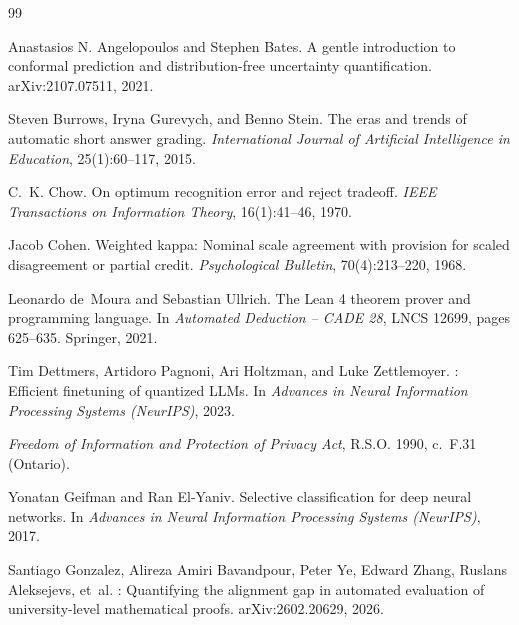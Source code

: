 \documentclass[11pt,a4paper]{article}
\theoremstyle{definition}
\begin{document}
\begin{thebibliography}{99}\small

Anastasios N. Angelopoulos and Stephen Bates.
\newblock A gentle introduction to conformal prediction and distribution-free uncertainty quantification.
\newblock arXiv:2107.07511, 2021.

Steven Burrows, Iryna Gurevych, and Benno Stein.
\newblock The eras and trends of automatic short answer grading.
\newblock \emph{International Journal of Artificial Intelligence in Education}, 25(1):60--117, 2015.

C.~K. Chow.
\newblock On optimum recognition error and reject tradeoff.
\newblock \emph{IEEE Transactions on Information Theory}, 16(1):41--46, 1970.

Jacob Cohen.
\newblock Weighted kappa: Nominal scale agreement with provision for scaled disagreement or partial credit.
\newblock \emph{Psychological Bulletin}, 70(4):213--220, 1968.

Leonardo de~Moura and Sebastian Ullrich.
\newblock The {Lean} 4 theorem prover and programming language.
\newblock In \emph{Automated Deduction -- CADE 28}, LNCS 12699, pages 625--635. Springer, 2021.

Tim Dettmers, Artidoro Pagnoni, Ari Holtzman, and Luke Zettlemoyer.
: Efficient finetuning of quantized {LLMs}.
\newblock In \emph{Advances in Neural Information Processing Systems (NeurIPS)}, 2023.

\emph{Freedom of Information and Protection of Privacy Act}, R.S.O. 1990, c.~F.31 (Ontario).

Yonatan Geifman and Ran El-Yaniv.
\newblock Selective classification for deep neural networks.
\newblock In \emph{Advances in Neural Information Processing Systems (NeurIPS)}, 2017.

Santiago Gonzalez, Alireza Amiri Bavandpour, Peter Ye, Edward Zhang, Ruslans Aleksejevs, et~al.
: Quantifying the alignment gap in automated evaluation of university-level mathematical proofs.
\newblock arXiv:2602.20629, 2026.


\end{thebibliography}
\end{document}
